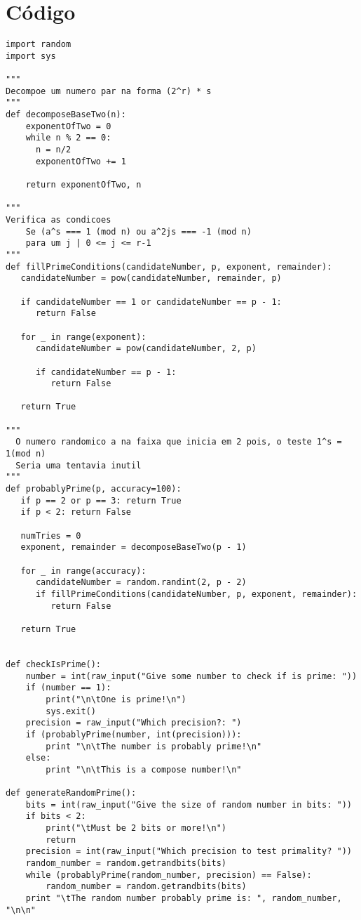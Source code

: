 \documentclass[a4paper,11pt]{article}
\theoremstyle{mytheor}
\begin{document}
\section*{Código}

\begin{lstlisting}[label={list:first},caption=Miller Rabin prime test em Python.]
import random
import sys

"""
Decompoe um numero par na forma (2^r) * s
"""
def decomposeBaseTwo(n):
    exponentOfTwo = 0
    while n % 2 == 0:
      n = n/2
      exponentOfTwo += 1
 
    return exponentOfTwo, n

"""
Verifica as condicoes
    Se (a^s === 1 (mod n) ou a^2js === -1 (mod n) 
    para um j | 0 <= j <= r-1
"""
def fillPrimeConditions(candidateNumber, p, exponent, remainder):
   candidateNumber = pow(candidateNumber, remainder, p)
 
   if candidateNumber == 1 or candidateNumber == p - 1:
      return False
 
   for _ in range(exponent):
      candidateNumber = pow(candidateNumber, 2, p)
 
      if candidateNumber == p - 1:
         return False
 
   return True
 
"""
  O numero randomico a na faixa que inicia em 2 pois, o teste 1^s = 1(mod n)
  Seria uma tentavia inutil
"""
def probablyPrime(p, accuracy=100):
   if p == 2 or p == 3: return True
   if p < 2: return False
 
   numTries = 0
   exponent, remainder = decomposeBaseTwo(p - 1)
 
   for _ in range(accuracy):
      candidateNumber = random.randint(2, p - 2)
      if fillPrimeConditions(candidateNumber, p, exponent, remainder):
         return False
 
   return True


def checkIsPrime():
    number = int(raw_input("Give some number to check if is prime: "))
    if (number == 1):
        print("\n\tOne is prime!\n")
        sys.exit()
    precision = raw_input("Which precision?: ")
    if (probablyPrime(number, int(precision))):
        print "\n\tThe number is probably prime!\n"
    else:
        print "\n\tThis is a compose number!\n"

def generateRandomPrime():
    bits = int(raw_input("Give the size of random number in bits: "))
    if bits < 2:
        print("\tMust be 2 bits or more!\n")
        return
    precision = int(raw_input("Which precision to test primality? "))
    random_number = random.getrandbits(bits)
    while (probablyPrime(random_number, precision) == False):
        random_number = random.getrandbits(bits)
    print "\tThe random number probably prime is: ", random_number, "\n\n"


\end{lstlisting}
\end{document}
